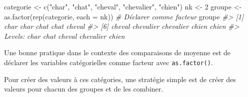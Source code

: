 \documentclass[
]{book}
\newenvironment{Shaded}{}{}
\newcommand{\AttributeTok}[1]{#1}
\newcommand{\CommentTok}[1]{\textit{#1}}
\newcommand{\DecValTok}[1]{#1}
\newcommand{\FunctionTok}[1]{#1}
\newcommand{\NormalTok}[1]{#1}
\newcommand{\OtherTok}[1]{#1}
\newcommand{\StringTok}[1]{#1}
\begin{document}
\begin{Shaded}
\begin{Highlighting}[]
\NormalTok{categorie }\OtherTok{\textless{}{-}} \FunctionTok{c}\NormalTok{(}\StringTok{"char"}\NormalTok{, }\StringTok{"chat"}\NormalTok{, }\StringTok{"cheval"}\NormalTok{, }\StringTok{"chevalier"}\NormalTok{, }\StringTok{"chien"}\NormalTok{)}
\NormalTok{nk }\OtherTok{\textless{}{-}} \DecValTok{2}
\NormalTok{groupe }\OtherTok{\textless{}{-}} \FunctionTok{as.factor}\NormalTok{(}\FunctionTok{rep}\NormalTok{(categorie, }\AttributeTok{each =}\NormalTok{ nk)) }\CommentTok{\# Déclarer comme facteur}
\NormalTok{groupe}
\CommentTok{\#\textgreater{}  [1] char      char      chat      chat      cheval   }
\CommentTok{\#\textgreater{}  [6] cheval    chevalier chevalier chien     chien    }
\CommentTok{\#\textgreater{} Levels: char chat cheval chevalier chien}
\end{Highlighting}
\end{Shaded}

Une bonne pratique dans le contexte des comparaisons de moyenne est de déclarer les variables catégorielles comme facteur avec \texttt{as.factor()}.

Pour créer des valeurs à ces catégories, une stratégie simple est de créer des valeurs pour chacun des groupes et de les combiner.
\end{document}
